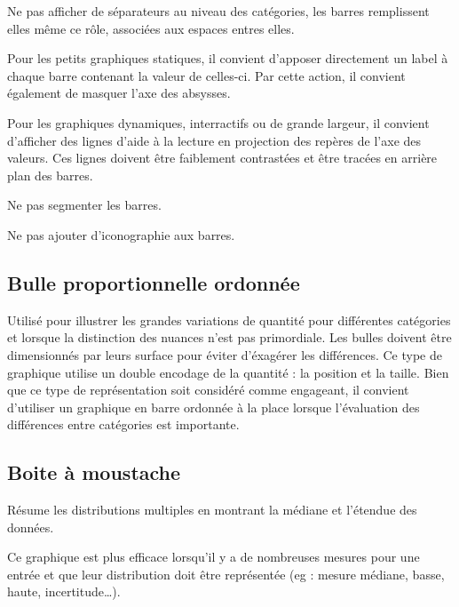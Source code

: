 \documentclass[a4paper,12pt]{article}
\begin{document}
\begin{multicols}{2}
Ne pas afficher de séparateurs au niveau des catégories, les barres remplissent elles même ce rôle, associées aux espaces entres elles. \autocite{jonathanschwabishComparingCategories2021}

Pour les petits graphiques statiques, il convient d'apposer directement un label à chaque barre contenant la valeur de celles-ci. Par cette action, il convient également de masquer l'axe des absysses. \autocite{jonathanschwabishComparingCategories2021}

Pour les graphiques dynamiques, interractifs ou de grande largeur, il convient d'afficher des lignes d'aide à la lecture en projection des repères de l'axe des valeurs. Ces lignes doivent être faiblement contrastées et être tracées en arrière plan des barres. \autocite{jonathanschwabishComparingCategories2021}

Ne pas segmenter les barres. \autocite{jonathanschwabishComparingCategories2021}

Ne pas ajouter d'iconographie aux barres. \autocite{tranDiscoveringAccessibleData2024}
\subsection*{Bulle proportionnelle ordonnée}
\label{sec:orge3267ba}
Utilisé pour illustrer les grandes variations de quantité pour différentes catégories et lorsque la distinction des nuances n'est pas primordiale. Les bulles doivent être dimensionnés par leurs surface pour éviter d'éxagérer les différences. \autocite{jonathanschwabishComparingCategories2021} Ce type de graphique utilise un double encodage de la quantité : la position et la taille. \autocite{wilkeVisualizingAssociationsTwo2019} Bien que ce type de représentation soit considéré comme engageant, il convient d'utiliser un graphique en barre ordonnée à la place lorsque l'évaluation des différences entre catégories est importante. \autocite{jonathanschwabishComparingCategories2021}
\subsection*{Boite à moustache}
\label{sec:org356848c}
Résume les distributions multiples en montrant la médiane et l'étendue des données. \autocite{alansmithLexiqueVisuel}

Ce graphique est plus efficace lorsqu'il y a de nombreuses mesures pour une entrée et que leur distribution doit être représentée (eg : mesure médiane, basse, haute, incertitude\ldots{}). \autocite{mikeyiHowChooseRight2020}


\end{multicols}
\end{document}
